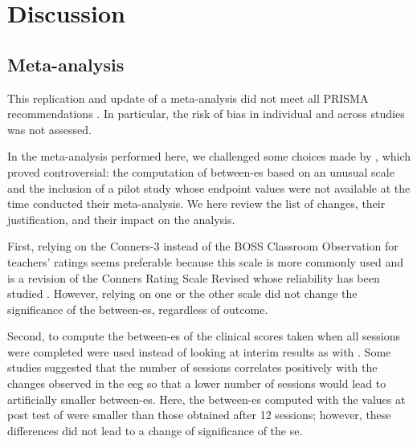 


\section{Discussion}

\subsection{Meta-analysis} 

This replication and update of a meta-analysis did not meet all PRISMA recommendations \citep{Moher2009}. In particular, the risk of bias
in individual and across studies was not assessed. 

In the meta-analysis performed here, we challenged some choices made by \citeauthor{Cortese2016}, which proved controversial: 
the computation of between-\gls{es} based on an unusual scale \citep{Steiner2014} and the inclusion of a pilot study \citep{Arnold2014} 
whose endpoint values were not available at the time \citeauthor{Cortese2016} conducted their meta-analysis. We here review the 
list of changes, their justification, and their impact on the analysis.
 
First, relying on the Conners-3 \citep{Conners2011} instead of the BOSS Classroom Observation \citep{Shapiro2010} for
teachers' ratings seems preferable because this scale is more commonly used \citep{Christiansen2014, Bluschke2016} and is
a revision of the Conners Rating Scale Revised \citep{Conners1998} whose reliability has been studied \citep{Collett2003}. 
However, relying on one or the other scale did not change the significance of the between-\gls{es}, regardless of outcome.

Second, to compute the between-\gls{es} of \citet{Arnold2014} the clinical scores taken when all sessions were completed were 
used instead of looking at interim results as with \citeauthor{Cortese2016}. Some studies suggested that the number of sessions 
correlates positively with the changes observed in the \gls{eeg} \citep{Vernon2004} so that a lower number of sessions would 
lead to artificially smaller between-\gls{es}. Here, the between-\gls{es} computed with the values at post test of \citet{Arnold2014} were smaller 
than those obtained after 12 sessions; however, these differences did not lead to a change of significance of the \gls{se}. 

